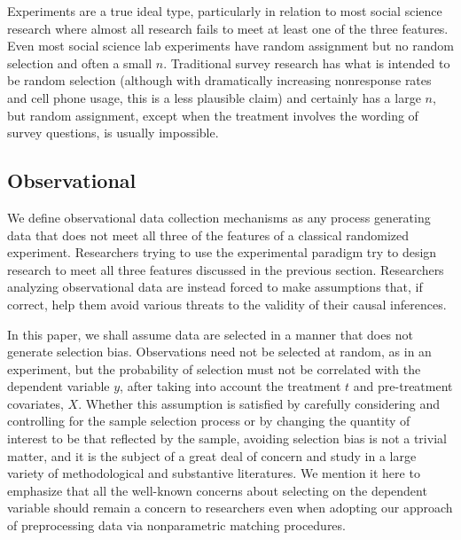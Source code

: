 \documentclass[11pt,titlepage]{article}
\begin{document}
Experiments are a true ideal type, particularly in relation to most
social science research where almost all research fails to meet at
least one of the three features.  Even most social science lab
experiments have random assignment but no random selection and often a
small $n$.  Traditional survey research has what is intended to be
random selection (although with dramatically increasing nonresponse
rates and cell phone usage, this is a less plausible claim) and
certainly has a large $n$, but random assignment, except when the
treatment involves the wording of survey questions, is usually
impossible.

\subsection{Observational}

We define observational data collection mechanisms as any process
generating data that does not meet all three of the features of a
classical randomized experiment.  Researchers trying to use the
experimental paradigm try to design research to meet all three
features discussed in the previous section.  Researchers analyzing
observational data are instead forced to make assumptions that, if
correct, help them avoid various threats to the validity of their
causal inferences.

In this paper, we shall assume data are selected in a manner that does
not generate selection bias.  Observations need not be selected at
random, as in an experiment, but the probability of selection must not
be correlated with the dependent variable $y$, after taking into
account the treatment $t$ and pre-treatment covariates, $X$.  Whether
this assumption is satisfied by carefully considering and controlling
for the sample selection process or by changing the quantity of
interest to be that reflected by the sample, avoiding selection bias
is not a trivial matter, and it is the subject of a great deal of
concern and study in a large variety of methodological and substantive
literatures.  We mention it here to emphasize that all the well-known
concerns about selecting on the dependent variable should remain a
concern to researchers even when adopting our approach of
preprocessing data via nonparametric matching procedures.
\end{document}
